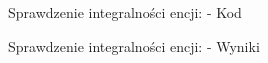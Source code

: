 \begin{figure}[H]
    \centering
    \caption{Sprawdzenie integralności encji: - Kod}
\end{figure}
\begin{figure}[H]
    \centering
    \caption{Sprawdzenie integralności encji: - Wyniki}
\end{figure}


